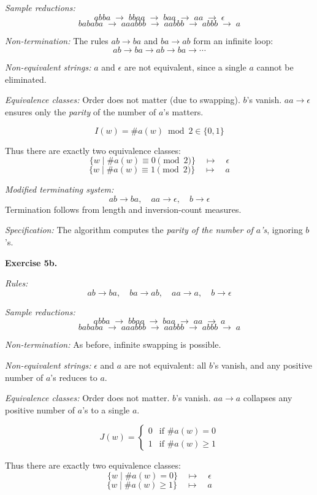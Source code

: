 \documentclass{article}
\theoremstyle{theorem}
\theoremstyle{definition}
\theoremstyle{remark}
\begin{document}
\textit{Sample reductions:}
\[
abba \;\to\; bbaa \;\to\; baa \;\to\; aa \;\to\; \epsilon
\]
\[
bababa \;\to\; aaabbb \;\to\; aabbb \;\to\; abbb \;\to\; a
\]

\textit{Non-termination:} The rules $ab \to ba$ and $ba \to ab$ form an infinite loop:
\[
ab \to ba \to ab \to ba \to \cdots
\]

\textit{Non-equivalent strings:} $a$ and $\epsilon$ are not equivalent, since a single $a$ cannot be eliminated.

\textit{Equivalence classes:}  
Order does not matter (due to swapping).  
$b$’s vanish.  
$aa \to \epsilon$ ensures only the \emph{parity} of the number of $a$’s matters.  

\[
I(w) = \#a(w) \bmod 2 \in \{0,1\}
\]

Thus there are exactly two equivalence classes:
\[
\{w \mid \#a(w) \equiv 0 \pmod 2\} \quad\longmapsto\quad \epsilon
\]
\[
\{w \mid \#a(w) \equiv 1 \pmod 2\} \quad\longmapsto\quad a
\]

\textit{Modified terminating system:}
\[
ab \to ba, \quad aa \to \epsilon, \quad b \to \epsilon
\]
Termination follows from length and inversion-count measures.  

\textit{Specification:} The algorithm computes the \emph{parity of the number of $a$’s}, ignoring $b$’s.

\vspace{1em}

\textbf{Exercise 5b.}

\textit{Rules:}
\[
ab \to ba, \quad ba \to ab, \quad aa \to a, \quad b \to \epsilon
\]

\textit{Sample reductions:}
\[
abba \;\to\; bbaa \;\to\; baa \;\to\; aa \;\to\; a
\]
\[
bababa \;\to\; aaabbb \;\to\; aabbb \;\to\; abbb \;\to\; a
\]

\textit{Non-termination:} As before, infinite swapping is possible.

\textit{Non-equivalent strings:} $\epsilon$ and $a$ are not equivalent: all $b$’s vanish, and any positive number of $a$’s reduces to $a$.

\textit{Equivalence classes:}  
Order does not matter.  
$b$’s vanish.  
$aa \to a$ collapses any positive number of $a$’s to a single $a$.  

\[
J(w) =
\begin{cases}
0 & \text{if } \#a(w) = 0 \\
1 & \text{if } \#a(w) \geq 1
\end{cases}
\]

Thus there are exactly two equivalence classes:
\[
\{w \mid \#a(w) = 0\} \quad\longmapsto\quad \epsilon
\]
\[
\{w \mid \#a(w) \geq 1\} \quad\longmapsto\quad a
\]
\end{document}
